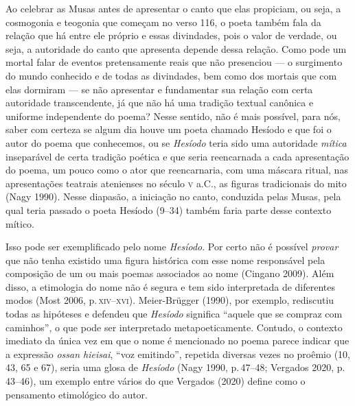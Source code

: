 Ao celebrar as Musas antes de apresentar o canto que elas propiciam, ou
seja, a cosmogonia e teogonia que começam no verso 116, o poeta também
fala da relação que há entre ele próprio e essas divindades, pois o
valor de verdade, ou seja, a autoridade do canto que apresenta depende
dessa relação. Como pode um mortal falar de eventos pretensamente reais
que não presenciou --- o surgimento do mundo conhecido e de todas as
divindades, bem como dos mortais que com elas dormiram --- se não
apresentar e fundamentar sua relação com certa autoridade transcendente,
já que não há uma tradição textual canônica e uniforme independente do
poema? Nesse sentido, não é mais possível, para nós, saber com certeza
se algum dia houve um poeta chamado Hesíodo e que foi o autor do poema
que conhecemos, ou se \textit{Hesíodo} teria sido uma autoridade
\textit{mítica} inseparável de certa tradição poética e que seria
reencarnada a cada apresentação do poema, um pouco como o ator que
reencarnaria, com uma máscara ritual, nas apresentações teatrais
atenienses no século \textsc{v} a.C., as figuras tradicionais do mito (Nagy
1990). Nesse diapasão, a iniciação no canto, conduzida pelas Musas, pela
qual teria passado o poeta Hesíodo (9--34) também faria parte desse
contexto mítico.

Isso pode ser exemplificado pelo nome \textit{Hesíodo}. Por certo não é
possível \textit{provar} que não tenha existido uma figura histórica com
esse nome responsável pela composição de um ou mais poemas associados ao
nome (Cingano 2009). Além disso, a etimologia do nome não é segura e tem
sido interpretada de diferentes modos (Most 2006, p.\,\textsc{xiv--xvi}).
Meier-Brügger (1990), por exemplo, rediscutiu todas as hipóteses e
defendeu que \textit{Hesíodo} significa ``aquele que se compraz com
caminhos'', o que pode ser interpretado metapoeticamente. Contudo, o
contexto imediato da única vez em que o nome é mencionado no poema
parece indicar que a expressão \textit{ossan hieisai}, ``voz emitindo'',
repetida diversas vezes no proêmio (10, 43, 65 e 67), seria uma glosa de
\textit{Hesíodo} (Nagy 1990, p.\,47--48; Vergados 2020, p.\,43--46), um exemplo
entre vários do que Vergados (2020) define como o pensamento etimológico do autor.

